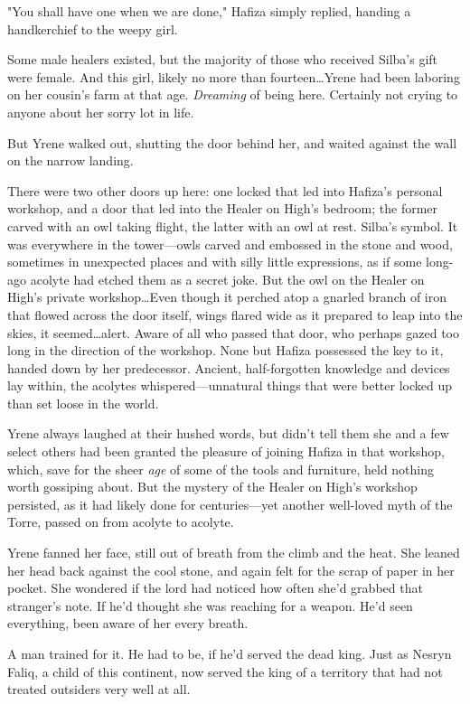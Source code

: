 "You shall have one when we are done," Hafiza simply replied, handing a handkerchief to the weepy girl.

Some male healers existed, but the majority of those who received Silba's gift were female.
And this girl, likely no more than fourteen\ldots Yrene had been laboring on her cousin's farm at that age.
\emph{Dreaming} of being here.
Certainly not crying to anyone about her sorry lot in life.

But Yrene walked out, shutting the door behind her, and waited against the wall on the narrow landing.

There were two other doors up here: one locked that led into Hafiza's personal workshop, and a door that led into the Healer on High's bedroom; the former carved with an owl taking flight, the latter with an owl at rest.
Silba's symbol.
It was everywhere in the tower---owls carved and embossed in the stone and wood, sometimes in unexpected places and with silly little expressions, as if some long-ago acolyte had etched them as a secret joke.
But the owl on the Healer on High's private workshop\ldots Even though it perched atop a gnarled branch of iron that flowed across the door itself, wings flared wide as it prepared to leap into the skies, it seemed\ldots alert.
Aware of all who passed that door, who perhaps gazed too long in the direction of the workshop.
None but Hafiza possessed the key to it, handed down by her predecessor.
Ancient, half-forgotten knowledge and devices lay within, the acolytes whispered---unnatural things that were better locked up than set loose in the world.

Yrene always laughed at their hushed words, but didn't tell them she and a few select others had been granted the pleasure of joining Hafiza in that workshop, which, save for the sheer \emph{age} of some of the tools and furniture, held nothing worth gossiping about.
But the mystery of the Healer on High's workshop persisted, as it had likely done for centuries---yet another well-loved myth of the Torre, passed on from acolyte to acolyte.

Yrene fanned her face, still out of breath from the climb and the heat.
She leaned her head back against the cool stone, and again felt for the scrap of paper in her pocket.
She wondered if the lord had noticed how often she'd grabbed that stranger's note.
If he'd thought she was reaching for a weapon.
He'd seen everything, been aware of her every breath.

A man trained for it.
He had to be, if he'd served the dead king.
Just as Nesryn Faliq, a child of this continent, now served the king of a territory that had not treated outsiders very well at all.

